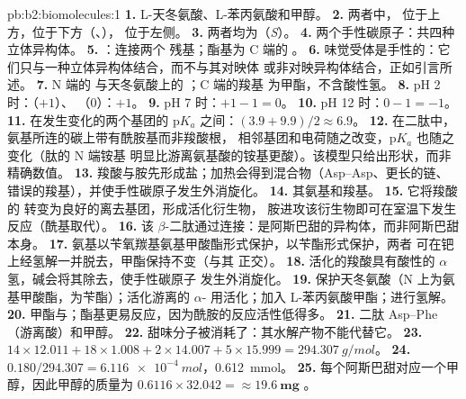 \begin{solution}{pb:b2:biomolecules:1}
\textbf{1.} L-天冬氨酸、L-苯丙氨酸和甲醇。
\textbf{2.} 两者中， 位于上方，位于下方（、），
 位于左侧。
\textbf{3.} 两者均为（\textit{S}）。
\textbf{4.} 两个手性碳原子：共四种立体异构体。
\textbf{5.} ：连接两个
残基；酯基为 C 端的 。
\textbf{6.} 味觉受体是手性的：它们只与一种立体异构体结合，而不与其对映体
或非对映异构体结合，正如引言所述。
\textbf{7.} N 端的  与天冬氨酸上的 ；C 端的羧基
为甲酯，不含酸性氢。
\textbf{8.} pH 2 时：（$+1$）、 （0）：$+1$。
\textbf{9.} pH 7 时：$+1 - 1 = 0$。
\textbf{10.} pH 12 时：$0 - 1 = -1$。
\textbf{11.} 在发生变化的两个基团的 $\mathrm pK_a$ 之间：$(3.9 + 9.9)/2 \approx 6.9$。
\textbf{12.} 在二肽中，氨基所连的碳上带有酰胺基而非羧酸根，
相邻基团和电荷随之改变，$\mathrm pK_a$ 也随之变化（肽的 N 端铵基
明显比游离氨基酸的铵基更酸）。该模型只给出形状，而非
精确数值。
\textbf{13.} 羧酸与胺先形成盐；加热会得到混合物（Asp--Asp、更长的链、
错误的羧基），并使手性碳原子发生外消旋化。
\textbf{14.} 其氨基和羧基。
\textbf{15.} 它将羧酸的  转变为良好的离去基团，形成活化衍生物，
胺进攻该衍生物即可在室温下发生反应（酰基取代）。
\textbf{16.} 该 $\beta$-二肽通过连接：是阿斯巴甜的异构体，而非阿斯巴甜本身。
\textbf{17.} 氨基以苄氧羰基氨基甲酸酯形式保护，以苄酯形式保护，两者
可在钯上经氢解一并脱去，甲酯保持不变（与其
正交）。
\textbf{18.} 活化的羧酸具有酸性的 $\alpha$ 氢，碱会将其除去，使手性碳原子
发生外消旋化。
\textbf{19.} 保护天冬氨酸（N 上为氨基甲酸酯，为苄酯）；活化游离的
$\alpha$- 用活化；加入 L-苯丙氨酸甲酯；进行氢解。
\textbf{20.} 甲酯与；酯基更易反应，因为酰胺的反应活性低得多。
\textbf{21.} 二肽 Asp--Phe（游离酸）和甲醇。
\textbf{22.} 甜味分子被消耗了：其水解产物不能代替它。
\textbf{23.} $14 \times 12.011 + 18 \times 1.008 + 2 \times 14.007 + 5 \times 15.999 =
\qty{294.307}{g/mol}$。
\textbf{24.} $0.180/294.307 = \qty{6.116e-4}{mol}$，\qty{0.612}{mmol}。
\textbf{25.} 每个阿斯巴甜对应一个甲醇，因此甲醇的质量为 $0.6116 \times 32.042 = \boldsymbol{\approx \qty{19.6}{mg}}$
。
\end{solution}
